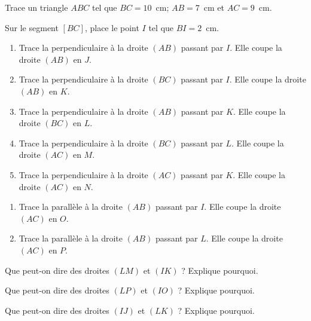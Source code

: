 \begin{myenumerate}
  \item Trace un triangle $ABC$ tel que $BC=10$~cm; $AB=7$~cm et $AC=9$~cm.
  \item Sur le segment $[BC]$, place le point $I$ tel que $BI=2$~cm.
  \item
    \begin{enumerate}
    \item Trace la perpendiculaire à la droite $(AB)$ passant par
      $I$. Elle coupe la droite $(AB)$ en $J$.
    \item Trace la perpendiculaire à la droite $(BC)$ passant par
      $I$. Elle coupe la droite $(AB)$ en $K$.
    \item Trace la perpendiculaire à la droite $(AB)$ passant par
      $K$. Elle coupe la droite $(BC)$ en $L$.
    \item Trace la perpendiculaire à la droite $(BC)$ passant par
      $L$. Elle coupe la droite $(AC)$ en $M$.
    \item Trace la perpendiculaire à la droite $(AC)$ passant par
      $K$. Elle coupe la droite $(AC)$ en $N$.
    \end{enumerate}
  \item
    \begin{enumerate}
    \item Trace la parallèle à la droite $(AB)$ passant par $I$. Elle
      coupe la droite $(AC)$ en $O$.
    \item Trace la parallèle à la droite $(AB)$ passant par $L$. Elle
      coupe la droite $(AC)$ en $P$.
    \end{enumerate}
\end{myenumerate}
\dotfill
\begin{myenumerate}
  \item Que peut-on dire des droites $(LM)$ et $(IK)$ ? Explique pourquoi.
  \item Que peut-on dire des droites $(LP)$ et $(IO)$ ? Explique pourquoi.
  \item Que peut-on dire des droites $(IJ)$ et $(LK)$ ? Explique pourquoi.
\end{myenumerate}
